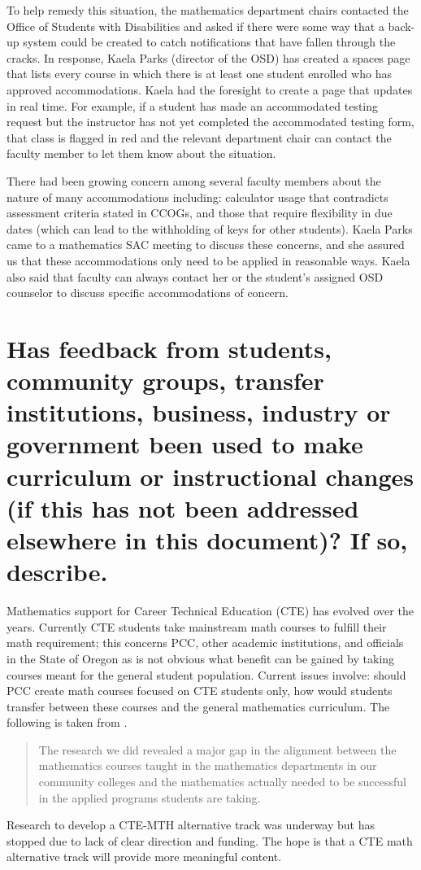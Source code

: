 To help remedy this situation, the mathematics department chairs contacted the
Office of Students with Disabilities and asked if there were some way that a
back-up system could be created to catch notifications that have fallen through
the cracks.  In response, Kaela Parks (director of the OSD) has created a
spaces page that lists every course in which there is at least one student
enrolled who has approved accommodations.  Kaela had the foresight to create a
page that updates in real time.  For example, if a student has made an
accommodated testing request but the instructor has not yet completed the
accommodated testing form, that class is flagged in red and the relevant
department chair can contact the faculty member to let them know about the
situation.

There had been growing concern among several faculty members
about the nature of many accommodations including:  calculator usage that 
contradicts assessment criteria stated in CCOGs, and  those that require flexibility 
in due dates (which can lead to the withholding of keys for other students).  Kaela Parks came to a mathematics SAC
meeting to discuss these concerns, and she assured us that these accommodations
only need to be applied in reasonable ways.  Kaela also said that 
faculty can always contact her or the student's assigned OSD counselor to
discuss specific accommodations of concern.

\section{Has feedback from students, community groups, transfer institutions,
business, industry or government been used to make curriculum or instructional
changes (if this has not been addressed elsewhere in this document)?  If so,
describe. }
Mathematics support for Career Technical Education (CTE) has evolved over the
years.  Currently CTE students take mainstream math courses to fulfill their
math requirement;  this concerns PCC, other academic institutions, and
officials in the State of Oregon as is not obvious what benefit can be gained 
by taking courses meant for the general student population.  Current issues involve: should PCC create
math courses focused on CTE students only, how would students  transfer between
these courses and the general mathematics curriculum.   The following is taken
from \cite{natcentereduc}.
\begin{quote}
  The research we did revealed a major gap in the alignment between the
  mathematics courses taught in the mathematics departments in our community
  colleges and the mathematics actually needed to be successful in the applied
  programs students are taking. 
\end{quote}
Research to develop a CTE-MTH alternative track was underway but has stopped
due to lack of clear direction and funding.  The hope is that a CTE math
alternative track will provide more meaningful content. 

